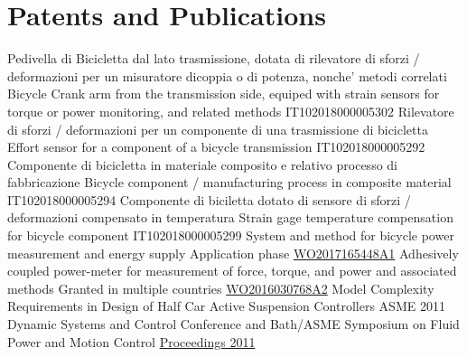 \documentclass[]{friggeri-cv}
\begin{document}
\section{Patents and Publications}
\begin{patentlist}
\pentry
    {Pedivella di Bicicletta dal lato trasmissione, dotata di rilevatore di sforzi / deformazioni per un misuratore dicoppia o di potenza, nonche' metodi correlati}
    {Bicycle Crank arm from the transmission side, equiped with strain sensors for torque or power monitoring, and related methods}    {IT102018000005302}
    \pentry
    {Rilevatore di sforzi / deformazioni per un componente di una trasmissione di bicicletta}
    {Effort sensor for a component of a bicycle transmission}
    {IT102018000005292}
    \pentry
    {Componente di bicicletta in materiale composito e relativo processo di fabbricazione}
    {Bicycle component / manufacturing process in composite material}
    {IT102018000005294}
    \pentry
    {Componente di biciletta dotato di sensore di sforzi / deformazioni compensato in temperatura }
    {Strain gage temperature compensation for bicycle component}
    {IT102018000005299}
    \pentry
    {System and method for bicycle power measurement and energy supply}
    {Application phase}
    {\href{https://patents.google.com/patent/WO2017165448A1/en}{WO2017165448A1}}
    \pentry
    {Adhesively coupled power-meter for measurement of force, torque, and power and associated methods}
    {Granted in multiple countries}
    {\href{https://patents.google.com/patent/WO2016030768A2/un}{WO2016030768A2}}
    \pentry
    {Model Complexity Requirements in Design of Half Car Active Suspension Controllers}
    {ASME 2011 Dynamic Systems and Control Conference and Bath/ASME Symposium on Fluid Power and Motion Control}
    {\href{http://proceedings.asmedigitalcollection.asme.org/proceeding.aspx?articleid=1638933}{Proceedings 2011}}
\end{patentlist}
\end{document}
